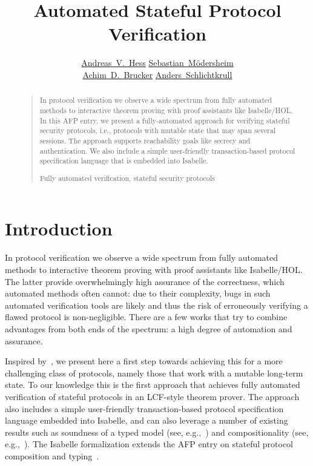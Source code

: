 \documentclass[10pt,DIV16,a4paper,abstract=true,twoside=semi,openright]
{scrreprt}
\title{Automated Stateful Protocol Verification}
\author{%
\begin{minipage}{.8\textwidth}
  \centering
      \href{https://www.dtu.dk/english/service/phonebook/person?id=64207}{Andreas~V.~Hess}\footnotemark[1]
      \qquad\qquad
      \href{https://people.compute.dtu.dk/samo/}{Sebastian~M{\"o}dersheim}\footnotemark[1]
      \\
      \href{http://www.brucker.ch/}{Achim~D.~Brucker}\footnotemark[2]
      \qquad\qquad
      \href{https://people.compute.dtu.dk/andschl}{Anders~Schlichtkrull}
     \end{minipage}
}
\begin{document}
  \maketitle
  \begin{abstract}
    \begin{quote}
      In protocol verification we observe a wide spectrum from fully
      automated methods to interactive theorem proving with proof
      assistants like Isabelle/HOL.
      In this AFP entry, we present a fully-automated approach for
      verifying stateful security protocols, i.e., protocols with mutable
      state that may span several sessions.
      The approach supports reachability goals like secrecy and
      authentication.
      We also include a simple user-friendly transaction-based
      protocol specification language that is embedded into Isabelle.
      
    \bigskip
      Fully automated verification, stateful security protocols
    \end{quote}
  \end{abstract}


\tableofcontents
\cleardoublepage

\chapter{Introduction}
  In protocol verification we observe a wide spectrum from fully
  automated methods to interactive theorem proving with proof
  assistants like Isabelle/HOL. The latter provide overwhelmingly high
  assurance of the correctness, which automated methods often cannot:
  due to their complexity, bugs in such automated verification tools
  are likely and thus the risk of erroneously verifying a flawed
  protocol is non-negligible. There are a few works that try to
  combine advantages from both ends of the spectrum: a high degree of
  automation and assurance.

  Inspired by~\cite{brucker.ea:integrating:2009}, we present here a
  first step towards achieving this for a more challenging class of
  protocols, namely those that work with a mutable long-term state. To
  our knowledge this is the first approach that achieves fully
  automated verification of stateful protocols in an LCF-style theorem
  prover.  The approach also includes a simple user-friendly
  transaction-based protocol specification language embedded into
  Isabelle, and can also leverage a number of existing results such as
  soundness of a typed model (see,
  e.g.,~\cite{hess:typing:2018,hess.ea:formalizing:2017,hess.ea:typing:2018})
  and compositionality (see,
  e.g.,~\cite{hess:typing:2018,hess.ea:stateful:2018}). The Isabelle 
  formalization extends the AFP entry on stateful protocol composition and 
  typing~\cite{hess.ea:stateful:2020}.
\end{document}
